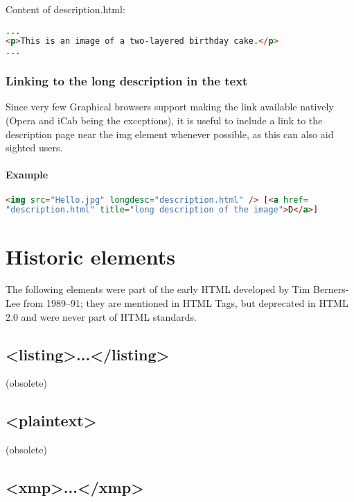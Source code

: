 Content of description.html:

\begin{lstlisting}[language=HTML]
...
<p>This is an image of a two-layered birthday cake.</p>
...
\end{lstlisting}




\subsection{Linking to the long description in the text}

Since very few Graphical browsers support making the link available natively (Opera and iCab being the exceptions), it is useful to include a link to the description page near the img element whenever possible, as this can also aid sighted users.



\subsubsection{Example}


\begin{lstlisting}[language=HTML]
<img src="Hello.jpg" longdesc="description.html" /> [<a href=
"description.html" title="long description of the image">D</a>]
\end{lstlisting}





\chapter{Historic elements}


The following elements were part of the early HTML developed by Tim Berners-Lee from 1989–91; they are mentioned in HTML Tags, but deprecated in HTML 2.0 and were never part of HTML standards.

\section{<listing>...</listing>}

(obsolete)


\section{<plaintext>}


(obsolete)


\section{<xmp>...</xmp>}

